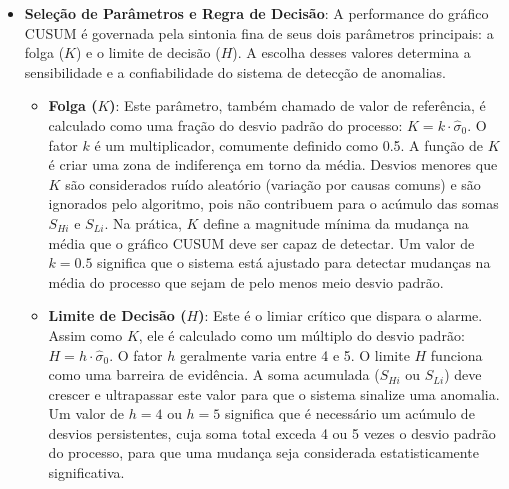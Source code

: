 \begin{itemize}
    \item \textbf{Seleção de Parâmetros e Regra de Decisão}: A performance do gráfico CUSUM é governada pela sintonia fina de seus dois parâmetros principais: a folga ($K$) e o limite de decisão ($H$). A escolha desses valores determina a sensibilidade e a confiabilidade do sistema de detecção de anomalias.

    \begin{itemize}
        \item \textbf{Folga ($K$)}: Este parâmetro, também chamado de valor de referência, é calculado como uma fração do desvio padrão do processo: $K = k \cdot \hat{\sigma}_0$. O fator $k$ é um multiplicador, comumente definido como 0.5. A função de $K$ é criar uma zona de indiferença em torno da média. Desvios menores que $K$ são considerados ruído aleatório (variação por causas comuns) e são ignorados pelo algoritmo, pois não contribuem para o acúmulo das somas $S_{Hi}$ e $S_{Li}$. Na prática, $K$ define a magnitude mínima da mudança na média que o gráfico CUSUM deve ser capaz de detectar. Um valor de $k=0.5$ significa que o sistema está ajustado para detectar mudanças na média do processo que sejam de pelo menos meio desvio padrão.

        \item \textbf{Limite de Decisão ($H$)}: Este é o limiar crítico que dispara o alarme. Assim como $K$, ele é calculado como um múltiplo do desvio padrão: $H = h \cdot \hat{\sigma}_0$. O fator $h$ geralmente varia entre 4 e 5. O limite $H$ funciona como uma barreira de evidência. A soma acumulada ($S_{Hi}$ ou $S_{Li}$) deve crescer e ultrapassar este valor para que o sistema sinalize uma anomalia. Um valor de $h=4$ ou $h=5$ significa que é necessário um acúmulo de desvios persistentes, cuja soma total exceda 4 ou 5 vezes o desvio padrão do processo, para que uma mudança seja considerada estatisticamente significativa.
    \end{itemize}


\end{itemize}
